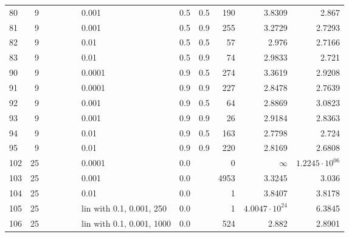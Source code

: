 \begin{longtable}{lrrrrrlrrrrr}
  80 &       9 &   &   &   &   &                       0.001 &  0.5 &    0.5 &     190 &                 3.8309 &                  2.867 \\
  81 &       9 &   &   &   &   &                       0.001 &  0.5 &    0.9 &     255 &                 3.2729 &                 2.7293 \\
  82 &       9 &   &   &   &   &                        0.01 &  0.5 &    0.5 &      57 &                  2.976 &                 2.7166 \\
  83 &       9 &   &   &   &   &                        0.01 &  0.5 &    0.9 &      74 &                 2.9833 &                  2.721 \\
  90 &       9 &   &   &   &   &                      0.0001 &  0.9 &    0.5 &     274 &                 3.3619 &                 2.9208 \\
  91 &       9 &   &   &   &   &                      0.0001 &  0.9 &    0.9 &     227 &                 2.8478 &                 2.7639 \\
  92 &       9 &   &   &   &   &                       0.001 &  0.9 &    0.5 &      64 &                 2.8869 &                 3.0823 \\
  93 &       9 &   &   &   &   &                       0.001 &  0.9 &    0.9 &      26 &                 2.9184 &                 2.8363 \\
  94 &       9 &   &   &   &   &                        0.01 &  0.9 &    0.5 &     163 &                 2.7798 &                  2.724 \\
  95 &       9 &   &   &   &   &                        0.01 &  0.9 &    0.9 &     220 &                 2.8169 &                 2.6808 \\
 102 &      25 &   &   &   &   &                      0.0001 &  0.0 &        &       0 &               $\infty$ &  $1.2245\cdot 10^{06}$ \\
 103 &      25 &   &   &   &   &                       0.001 &  0.0 &        &    4953 &                 3.3245 &                  3.036 \\
 104 &      25 &   &   &   &   &                        0.01 &  0.0 &        &       1 &                 3.8407 &                 3.8178 \\
 105 &      25 &   &   &   &   &    lin with 0.1, 0.001, 250 &  0.0 &        &       1 &  $4.0047\cdot 10^{24}$ &                 6.3845 \\
 106 &      25 &   &   &   &   &   lin with 0.1, 0.001, 1000 &  0.0 &        &     524 &                  2.882 &                 2.8901 \\

\end{longtable}
